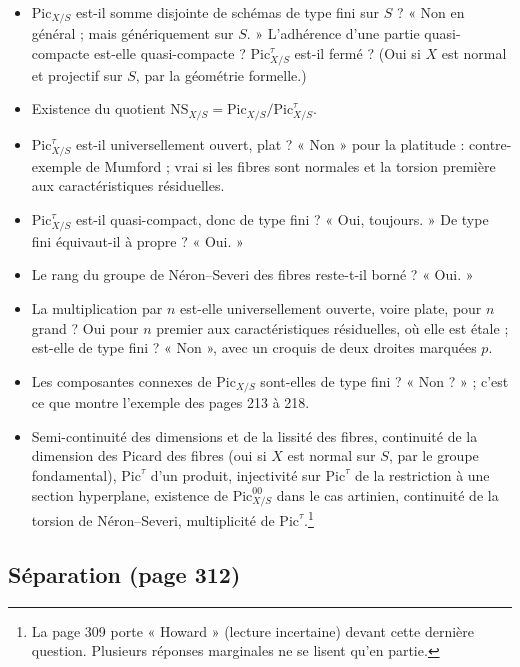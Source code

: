 \documentclass[11pt,a4paper]{article}
\begin{document}
\begin{itemize}
  \item $\mathrm{Pic}_{X/S}$ est-il somme disjointe de schémas de type fini sur
    $S$ ? « Non en général ; mais génériquement sur $S$. » L'adhérence d'une
    partie quasi-compacte est-elle quasi-compacte ? $\mathrm{Pic}^\tau_{X/S}$
    est-il fermé ? (Oui si $X$ est normal et projectif sur $S$, par la
    géométrie formelle.)
  \item Existence du quotient $\mathrm{NS}_{X/S} = \mathrm{Pic}_{X/S}/\mathrm{Pic}^\tau_{X/S}$.
  \item $\mathrm{Pic}^\tau_{X/S}$ est-il universellement ouvert, plat ? « Non »
    pour la platitude : contre-exemple de Mumford ; vrai si les fibres sont
    normales et la torsion première aux caractéristiques résiduelles.
  \item $\mathrm{Pic}^\tau_{X/S}$ est-il quasi-compact, donc de type fini ?
    « Oui, toujours. » De type fini équivaut-il à propre ? « Oui. »
  \item Le rang du groupe de Néron--Severi des fibres reste-t-il borné ?
    « Oui. »
  \item La multiplication par $n$ est-elle universellement ouverte, voire plate,
    pour $n$ grand ? Oui pour $n$ premier aux caractéristiques résiduelles,
    où elle est étale ; est-elle de type fini ? « Non », avec un croquis de
    deux droites marquées $p$.
  \item Les composantes connexes de $\mathrm{Pic}_{X/S}$ sont-elles de type
    fini ? « Non ? » ; c'est ce que montre l'exemple des pages 213 à 218.
  \item Semi-continuité des dimensions et de la lissité des fibres, continuité
    de la dimension des Picard des fibres (oui si $X$ est normal sur $S$, par
    le groupe fondamental), $\mathrm{Pic}^\tau$ d'un produit, injectivité sur
    $\mathrm{Pic}^\tau$ de la restriction à une section hyperplane,
    existence de $\mathrm{Pic}^{00}_{X/S}$ dans le cas artinien, continuité de
    la torsion de Néron--Severi, multiplicité de $\mathrm{Pic}^\tau$.\footnote{La
    page 309 porte « Howard » (lecture incertaine) devant cette dernière
    question. Plusieurs réponses marginales ne se lisent qu'en partie.}
\end{itemize}

\subsection*{Séparation (page 312)}
\end{document}
